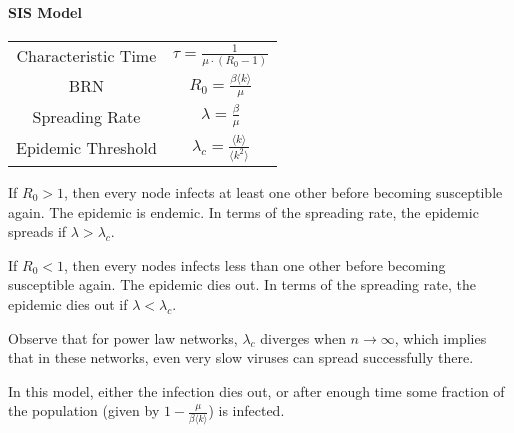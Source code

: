 \documentclass[english]{panikzettel}
\begin{document}
\begin{minipage}[t]{0.475\textwidth}
    \paragraph{SIS Model}
    \begin{center}

        \begin{tabular}{c|c}
            Characteristic Time & $\tau = \frac{1}{\mu \cdot (R_0 - 1)}$ \\
            BRN & $R_0 = \frac{\beta \langle k \rangle}{\mu}$ \\
            Spreading Rate & $\lambda = \frac{\beta}{\mu}$ \\
            Epidemic Threshold & $\lambda_c = \frac{\langle k \rangle}{\langle k^2 \rangle}$ \\
        \end{tabular}
    \end{center}
    If $R_0 > 1$, then every node infects at least one other before becoming susceptible again.
    The epidemic is endemic.
    In terms of the spreading rate, the epidemic spreads if $\lambda > \lambda_c$.

    If $R_0 < 1$, then every nodes infects less than one other before becoming susceptible again. The epidemic dies out.
    In terms of the spreading rate, the epidemic dies out if $\lambda < \lambda_c$.

    Observe that for power law networks, $\lambda_c$ diverges when $n \to \infty$, which implies that in these networks, even very slow viruses can spread successfully there.

    In this model, either the infection dies out, or after enough time some fraction of the population (given by $1-\frac{\mu}{\beta \langle k \rangle}$) is infected.
\end{minipage}\hfil{\color[gray]{0.7}\vline}\hfil%
\end{document}
